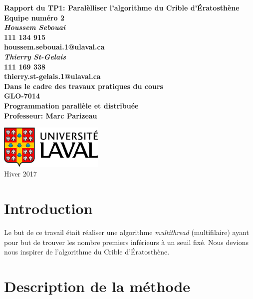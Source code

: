\documentclass{report}
\begin{document}
\renewcommand{\labelitemi}{$\bullet$}
\renewcommand{\labelitemii}{$\circ$}
\thispagestyle{empty}

\begin{center}
	\vspace*{1cm}
	\huge  \bf Rapport du TP1: Paralèlliser l'algorithme du Crible d'Ératosthène\\
	\vspace{1cm}
	\LARGE Equipe numéro 2\\
	\vspace{1.5cm}
	\normalsize
	\textit{Houssem Sebouai}\\
	111 134 915\\
	houssem.sebouai.1@ulaval.ca\\

  \vspace{1cm}
	\normalsize
	\textit{Thierry St-Gelais}\\
111 169 338\\
thierry.st-gelais.1@ulaval.ca\\

	\vspace{2cm}
	Dans le cadre des travaux pratiques du cours\\
	\LARGE GLO-7014\\
	\large Programmation parallèle et distribuée\\
	Professeur: Marc Parizeau

	\vfill
	\includegraphics[width=5cm]{Images/logo.jpg}
	\\
	Hiver 2017
\end{center}

\newpage

\tableofcontents
\listoffigures
\listoftables
\newpage
\chapter{Introduction}

	Le but de ce travail était réaliser une algorithme {\it multithread} (multifilaire)
	ayant pour but de trouver les nombre premiers inférieurs à un seuil fixé.
	Nous devions nous inspirer de l'algorithme du Crible d'Ératosthène.

\newpage
\chapter{Description de la méthode}
\end{document}
